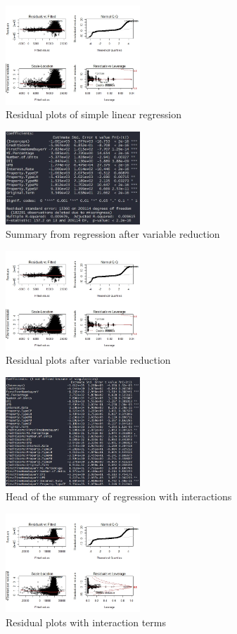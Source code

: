 \documentclass[10pt,twocolumn,letterpaper]{article}
\begin{document}
\begin{figure}
	\includegraphics[width=0.45\textwidth]{images/lm1.jpeg}
	\caption{Residual plots of simple linear regression}
	\label{fig:lm1c}
\end{figure}



\begin{figure}
	\includegraphics[width=0.45\textwidth]{images/lm2s.jpg}
	\caption{Summary from regression after variable reduction}
	\label{fig:lm2s}
\end{figure}

\begin{figure}
	\includegraphics[width=0.45\textwidth]{images/lm1.jpeg}
	\caption{Residual plots after variable reduction}
	\label{fig:lm2c}
\end{figure}

\begin{figure}
	\includegraphics[width=0.45\textwidth]{images/lm3s.jpg}
	\caption{Head of the summary of regression with interactions}
	\label{fig:lm3s}
\end{figure}

\begin{figure}
	\includegraphics[width=0.45\textwidth]{images/lm3.jpeg}
	\caption{Residual plots with interaction terms}
	\label{fig:lm3c}
\end{figure}
\end{document}
